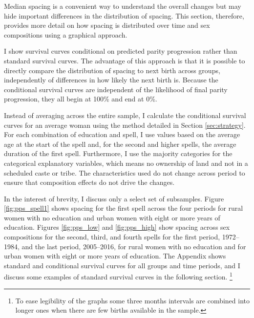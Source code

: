 \documentclass[12pt,letterpaper]{article}
\begin{document}
Median spacing is a convenient way to understand the overall changes but
may hide important differences in the distribution of spacing.
This section, therefore, provides more detail on how spacing is distributed
over time and sex compositions using a graphical approach.

I show survival curves conditional on predicted parity progression rather than
standard survival curves. 
The advantage of this approach is that it is possible to directly compare 
the distribution of spacing to next birth across groups, independently of 
differences in how likely the next birth is.
Because the conditional survival curves are independent of the likelihood
of final parity progression, they all begin at 100\% and end at 0\%.

Instead of averaging across the entire sample, I calculate the conditional
survival curves for an average woman using the method detailed in 
Section \ref{sec:strategy}.
For each combination of education and spell, I use values based on the
average age at the start of the spell and, for the second and higher
spells, the average duration of the first spell.
Furthermore, I use the majority categories for the categorical explanatory 
variables, which means no ownership of land and not in a scheduled caste or 
tribe.
The characteristics used do not change across period to ensure that 
composition effects do not drive the changes.

In the interest of brevity, I discuss only a select set of subsamples.
Figure \ref{fig:pps_spell1} shows spacing for the first spell across the
four periods for rural women with no education and urban women with 
eight or more years of education.
Figures \ref{fig:pps_low} and \ref{fig:pps_high} show spacing across sex
compositions for the second, third, and fourth spells for the first period, 
1972--1984, and the last period, 2005--2016, for rural women with no 
education and for urban women with eight or more years of education.
The Appendix shows standard and conditional survival curves for all groups and 
time periods, and I discuss some examples of standard survival
curves in the following section.%
\footnote{
To ease legibility of the graphs some three months intervals are combined
into longer ones when there are few births available in the sample.
}

\end{document}
